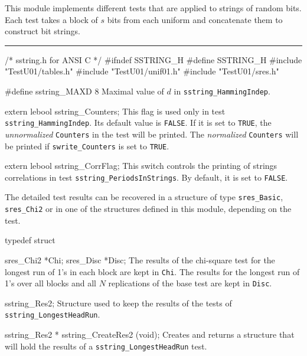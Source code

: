 
This module implements different tests that are applied to
strings of random bits.   Each test takes a block of $s$ bits 
from each uniform and concatenate them to construct bit strings.
\resdef


\bigskip
\hrule
\code\hide
/* sstring.h for ANSI C */
#ifndef SSTRING_H
#define SSTRING_H
\endhide
#include "TestU01/tables.h" 
#include "TestU01/unif01.h"
#include "TestU01/sres.h"
\endcode
\ifdetailed  %

\code


#define sstring_MAXD 8
\endcode
 \tab
 Maximal value of $d$ in {\tt sstring\_HammingIndep}.   
 \endtab
\code


extern lebool sstring_Counters;
\endcode
 \tab
   This flag is used only in test {\tt sstring\_HammingIndep}.
   Its default value is {\tt FALSE}.
   If it is set to {\tt TRUE}, the {\it unnormalized} {\tt Counters} in
   the test will be printed. The {\it normalized} {\tt Counters} 
   will be printed if   {\tt swrite\_Counters} is set to  {\tt TRUE}.
 \endtab
\code


extern lebool sstring_CorrFlag;
\endcode
 \tab 
  This switch controls the printing of strings correlations
  in test {\tt sstring\_PeriodsInStrings}. By default, it is set to
  {\tt FALSE}.
 \endtab




The detailed test results can be recovered in a structure of type
{\tt sres\_Basic}, {\tt sres\_Chi2} or in one of the structures
defined in this module, depending on the test.

\code

typedef struct {

   sres_Chi2 *Chi;
   sres_Disc *Disc;
\endcode
 \tabb
  The results of the chi-square test for the longest run of 1's in each
  block are kept in {\tt Chi}.  The results for the longest run of 1's 
  over all blocks and all $N$ replications of the base test are kept in
  {\tt Disc}.
 \endtabb
\code

} sstring_Res2;
\endcode
 \tab
  Structure used to keep the results of the tests of
  {\tt sstring\_LongestHeadRun}.
 \endtab
\code


sstring_Res2 * sstring_CreateRes2 (void);
\endcode
 \tab 
  Creates and returns a structure that will hold the results
  of a  {\tt sstring\_LongestHeadRun} test. 
 \endtab
\code


